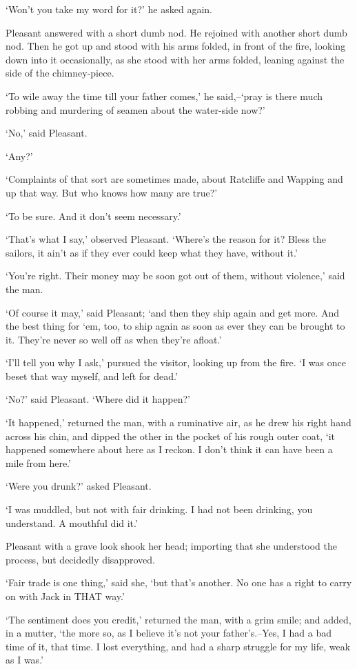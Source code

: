 ‘Won’t you take my word for it?’ he asked again.

Pleasant answered with a short dumb nod. He rejoined with another short
dumb nod. Then he got up and stood with his arms folded, in front of
the fire, looking down into it occasionally, as she stood with her arms
folded, leaning against the side of the chimney-piece.

‘To wile away the time till your father comes,’ he said,--‘pray is there
much robbing and murdering of seamen about the water-side now?’

‘No,’ said Pleasant.

‘Any?’

‘Complaints of that sort are sometimes made, about Ratcliffe and Wapping
and up that way. But who knows how many are true?’

‘To be sure. And it don’t seem necessary.’

‘That’s what I say,’ observed Pleasant. ‘Where’s the reason for it?
Bless the sailors, it ain’t as if they ever could keep what they have,
without it.’

‘You’re right. Their money may be soon got out of them, without
violence,’ said the man.

‘Of course it may,’ said Pleasant; ‘and then they ship again and get
more. And the best thing for ‘em, too, to ship again as soon as ever
they can be brought to it. They’re never so well off as when they’re
afloat.’

‘I’ll tell you why I ask,’ pursued the visitor, looking up from the
fire. ‘I was once beset that way myself, and left for dead.’

‘No?’ said Pleasant. ‘Where did it happen?’

‘It happened,’ returned the man, with a ruminative air, as he drew his
right hand across his chin, and dipped the other in the pocket of his
rough outer coat, ‘it happened somewhere about here as I reckon. I don’t
think it can have been a mile from here.’

‘Were you drunk?’ asked Pleasant.

‘I was muddled, but not with fair drinking. I had not been drinking, you
understand. A mouthful did it.’

Pleasant with a grave look shook her head; importing that she understood
the process, but decidedly disapproved.

‘Fair trade is one thing,’ said she, ‘but that’s another. No one has a
right to carry on with Jack in THAT way.’

‘The sentiment does you credit,’ returned the man, with a grim smile;
and added, in a mutter, ‘the more so, as I believe it’s not your
father’s.--Yes, I had a bad time of it, that time. I lost everything,
and had a sharp struggle for my life, weak as I was.’

